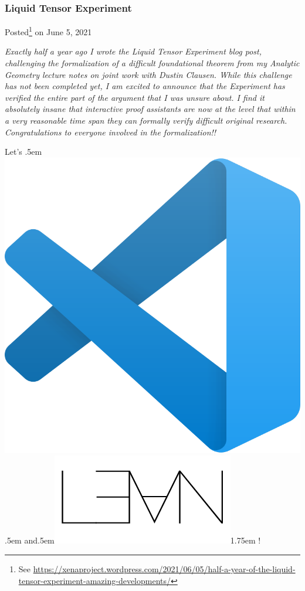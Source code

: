 \documentclass[10pt]{beamer}
\begin{document}
\begin{frame}
\frametitle{Liquid Tensor Experiment}
Posted\footnote{See \url{https://xenaproject.wordpress.com/2021/06/05/half-a-year-of-the-liquid-tensor-experiment-amazing-developments/}} on June 5, 2021
\vspace{.5cm}

\emph{Exactly half a year ago I wrote the Liquid Tensor Experiment blog post, challenging the formalization of a difficult foundational theorem from my Analytic Geometry lecture notes on joint work with Dustin Clausen. While this challenge has not been completed yet, I am excited to announce that \textcolor{arancio}{the Experiment has verified the entire part of the argument that I was unsure about}. I find it absolutely insane that \textcolor{arancio}{interactive proof assistants are now at the level that within a very reasonable time span they can formally verify difficult original research}. Congratulations to everyone involved in the formalization!!}
\pause

\vspace{.75cm}
Let's \kern.5em
\includegraphics[trim=0 9cm 0 0, scale=.025]{vscode_logo.png}\kern.5em and\kern.5em\includegraphics[trim=0 1.45cm 5cm 5cm, scale=.1]{lean_logo.png}\kern1.75em !
\end{frame}
\end{document}
